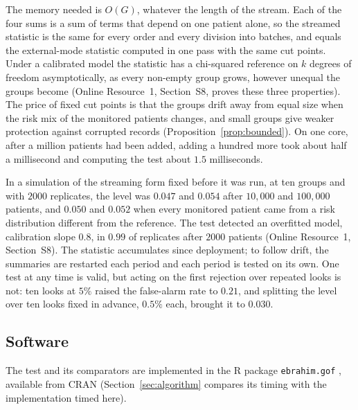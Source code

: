 The memory needed is $O(G)$, whatever the length of the stream. Each of the four sums is a sum of terms
that depend on one patient alone, so the streamed statistic is the same for every order and every
division into batches, and equals the external-mode statistic computed in one pass with the same cut
points. Under a calibrated model the statistic has a chi-squared reference on $k$ degrees of freedom
asymptotically, as every non-empty group grows, however unequal the groups become (Online Resource~1,
Section~S8, proves these three properties). The price of fixed cut points is that the groups drift
away from equal size when the risk mix of the monitored patients changes, and small groups give weaker
protection against corrupted records (Proposition~\ref{prop:bounded}). On one core, after a million
patients had been added, adding a hundred more took about half a millisecond and computing the test
about $1.5$ milliseconds.

In a simulation of the streaming form fixed before it was run, at ten groups and with $2000$
replicates, the level was $0.047$ and $0.054$ after $10{,}000$ and $100{,}000$ patients, and $0.050$ and
$0.052$ when every monitored patient came from a risk distribution different from the reference. The
test detected an overfitted model, calibration slope $0.8$, in $0.99$ of replicates after $2000$
patients (Online Resource~1, Section~S8). The statistic accumulates since deployment; to follow drift,
the summaries are restarted each period and each period is tested on its own. One test at any time is
valid, but acting on the first rejection over repeated looks is not: ten looks at $5\%$ raised the
false-alarm rate to $0.21$, and splitting the level over ten looks fixed in advance, $0.5\%$ each,
brought it to $0.030$.

\subsection{Software}\label{sec:software}

The test and its comparators are implemented in the R package \texttt{ebrahim.gof}
\citep{ebrahim2025gof}, available from CRAN (Section~\ref{sec:algorithm} compares its timing with the
implementation timed here).

